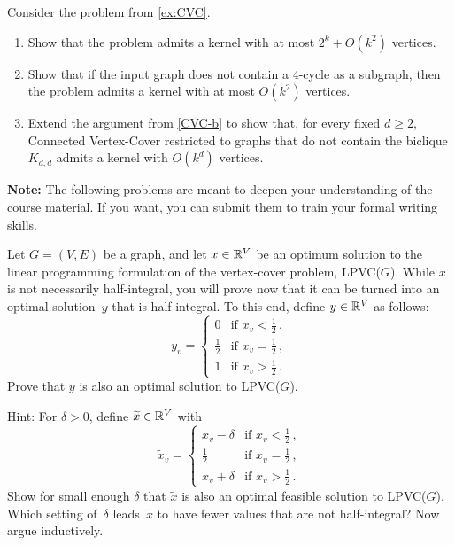 \documentclass[english]{uebung_cs}
\begin{document}
\begin{exercise}
  Consider the problem from \ref{ex:CVC}.
  \begin{enumerate}
      \item Show that the problem admits a kernel with at most $2^k + O(k^2)$ vertices.
      \item\label{CVC-b} Show that if the input graph does not contain a $4$-cycle as a subgraph, then the problem admits a
      kernel with at most $O(k^2)$ vertices.
      \item Extend the argument from \ref{CVC-b} to show that, for every fixed $d \geq 2$, Connected Vertex-Cover restricted to graphs that do not contain the biclique $K_{d,d}$ admits a kernel with $O(k^d)$ vertices.
  \end{enumerate}
\end{exercise}

\newpage
\textbf{Note:} The following problems are meant to deepen your understanding of the course material. If you want, you can submit them to train your formal writing skills.

\begin{exercise}
  Let $G = (V, E)$ be a graph, and let $x \in \mathbb{R}^V$ be an
  optimum solution to the linear programming formulation of the vertex-cover problem, LPVC($G$). While $x$ is not necessarily half-integral, you will prove now that it can be turned into an optimal solution~$y$ that is half-integral. To this end, define
  $y\in\mathbb{R}^V$ as follows:
  \[
  y_v = \begin{cases}
  0 & \text{if } x_v < \frac{1}{2}\,, \\
  \frac{1}{2} & \text{if } x_v = \frac{1}{2}\,, \\
  1 & \text{if } x_v > \frac{1}{2}\,.
  \end{cases}
  \]
  Prove that $y$ is also an optimal solution to LPVC($G$).

  Hint: For $\delta>0$, define $\widetilde x\in\mathbb{R}^V$ with\[
    \widetilde x_v = \begin{cases}
    x_v-\delta & \text{if } x_v < \frac{1}{2}\,, \\
    \frac{1}{2} & \text{if } x_v = \frac{1}{2}\,, \\
    x_v+\delta & \text{if } x_v > \frac{1}{2}\,.
    \end{cases}
    \]
    Show for small enough $\delta$ that $\widetilde x$ is also an optimal feasible solution to LPVC($G$). Which setting of~$\delta$ leads~$\widetilde x$ to have fewer values that are not half-integral? Now argue inductively.
\end{exercise}
\end{document}
